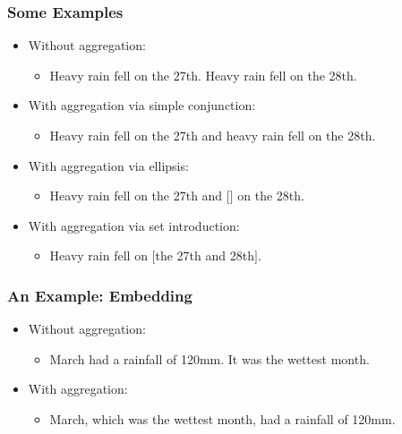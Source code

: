 \documentclass[compress,color=usenames]{beamer}
\begin{document}
\begin{frame}
\frametitle{Some Examples}

\label{f206}
\begin{itemize}
\item { {Without aggregation:}}
\begin{itemize}
\item Heavy rain fell on the 27th.
Heavy rain fell on the 28th.
\end{itemize}
\item { {With aggregation via simple conjunction:}}
\begin{itemize}
\item Heavy rain fell on the 27th and heavy rain fell on the 28th.
\end{itemize}
\item { {With aggregation via ellipsis: }}
\begin{itemize}
\item Heavy rain fell on the 27th and \mbox{$[$}\mbox{$]$} on the 28th.
\end{itemize}
\item { {With aggregation via set introduction: }}
\begin{itemize}
\item Heavy rain fell on \mbox{$[$}the 27th and 28th\mbox{$]$}.
\end{itemize}
\end{itemize}
 \end{frame}

\begin{frame}
\frametitle{An Example: Embedding}

\label{f208}
\begin{itemize}
\item { {Without aggregation:}}
\begin{itemize}
\item March had a rainfall of 120mm. 
It was the wettest month.
\end{itemize}
\item { {With aggregation:}}
\begin{itemize}
\item March, which was the wettest month, had a rainfall of 120mm.
\end{itemize}
\end{itemize}
 
\end{frame}
\end{document}
